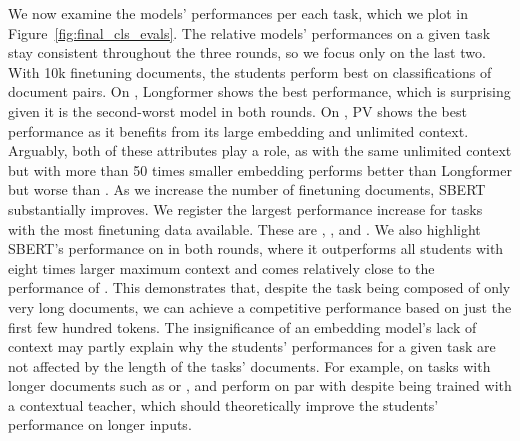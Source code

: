 We now examine the models' performances per each task, which we plot in
Figure~\ref{fig:final_cls_evals}. The relative models' performances on a given
task stay consistent throughout the three rounds, so we focus only on the last
two. With 10k finetuning documents, the students perform best on
classifications of document pairs. On , Longformer shows the best
performance, which is surprising given it is the second-worst model in both
rounds. On , PV shows the best performance as it benefits from its
large embedding and unlimited context. Arguably, both of these attributes play
a role, as  with the same unlimited context but with more than 50
times smaller embedding performs better than Longformer but worse than
. As we increase the number of finetuning documents, SBERT
substantially improves. We register the largest performance increase for tasks
with the most finetuning data available. These are , , and
. We also highlight SBERT's performance on  in both
rounds, where it outperforms all students with eight times larger maximum
context and comes relatively close to the performance of . This
demonstrates that, despite the task being composed of only very long documents,
we can achieve a competitive performance based on just the first few hundred
tokens. The insignificance of an embedding model's lack of context may partly
explain why the students' performances for a given task are not affected by the
length of the tasks' documents. For example, on tasks with longer documents
such as  or , {\CosineStudent} and {\MSEStudent} perform
on par with {\OnlyMSEStudent} despite being trained with a contextual teacher,
which should theoretically improve the students' performance on longer inputs.

